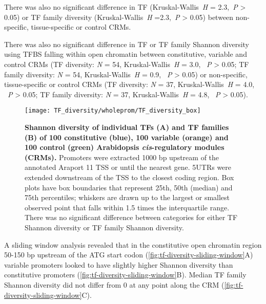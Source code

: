 \documentclass[../main.tex]{subfiles}
\begin{document}
{{There was also no significant difference in TF (Kruskal\hyp{}Wallis~\textit{H} = 2.3,~\textit{P} \textgreater{} 0.05) or TF family diversity (Kruskal\hyp{}Wallis~\textit{H} =2.3,~\textit{P} \textgreater{} 0.05) between non\hyp{}specific, tissue\hyp{}specific or control CRMs.

There was also no significant difference in TF or TF family Shannon diversity using TFBS falling within open chromatin between constitutive, variable and control CRMs (TF diversity: \textit{N} = 54, Kruskal\hyp{}Wallis~\textit{H} = 3.0, ~\textit{P} \textgreater{} 0.05; TF family diversity: \textit{N} = 54, Kruskal\hyp{}Wallis~\textit{H} = 0.9, ~\textit{P} \textgreater{} 0.05) or non\hyp{}specific, tissue\hyp{}specific or control CRMs (TF diversity: \textit{N} = 37, Kruskal\hyp{}Wallis~\textit{H} = 4.0, ~\textit{P} \textgreater{} 0.05; TF family diversity: \textit{N} = 37, Kruskal\hyp{}Wallis~\textit{H} = 4.8, ~\textit{P} \textgreater{} 0.05).

\begin{figure}[hbt!]
	\begin{center}
		\capstart
		\texttt{[image: TF\_diversity/wholeprom/TF\_diversity\_box]}
		\caption{
			\textbf{Shannon diversity of individual TFs (A) and TF families (B) of 100 constitutive (blue), 100 variable (orange) and 100 control (green) Arabidopsis \textit{cis}\hyp{}regulatory modules (CRMs).}
			Promoters were extracted 1000 bp upstream of the annotated Araport 11 \autocite{chengAraport11CompleteReannotation2017} TSS or until the nearest gene.
			5UTRs were extended downstream of the TSS to the closest coding region.  Box plots have box boundaries that represent 25th, 50th (median) and 75th percentiles; whiskers are drawn up to the largest or smallest observed point that falls within 1.5 times the interquartile range.
			There was no significant difference between categories for either TF Shannon diversity or TF family Shannon diversity.
			\label{fig:tf-diversity-wholeprom}
		}
	\end{center}
\end{figure}

A sliding window analysis revealed that in the constitutive open chromatin region 50-150 bp upstream of the ATG start codon (\autoref{fig:tf-diversity-sliding-window}A) variable promoters looked to have slightly higher Shannon diversity than constitutive promoters (\autoref{fig:tf-diversity-sliding-window}B). Median TF family Shannon diversity did not differ from 0 at any point along the CRM (\autoref{fig:tf-diversity-sliding-window}C).

}}
\end{document}
